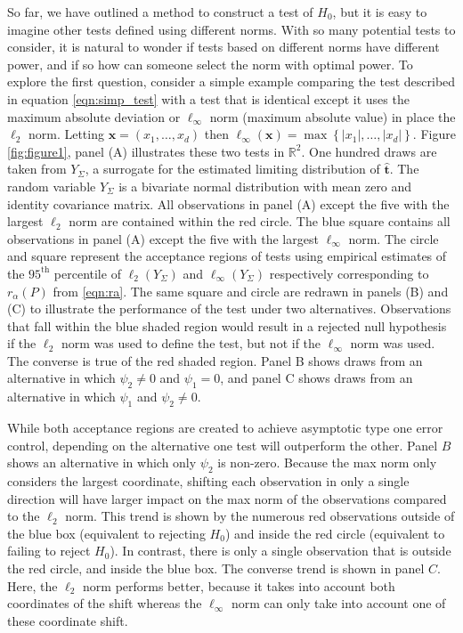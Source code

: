 \documentclass{article}
\newcommand{\tst}{\hat{\boldsymbol{t}}}
\newcommand{\nrvs}{Y_\Sigma}
\begin{document}
So far, we have outlined a method to construct a test of $H_0$, but it is easy to imagine other tests defined using different norms. With so many potential tests to consider, it is natural to wonder if tests based on different norms have different power, and if so how can someone select the norm with optimal power. To explore the first question, consider a simple example comparing the test described in equation \eqref{eqn:simp_test} with a test that is identical except it uses the maximum absolute deviation or $\ell_\infty$ norm (maximum absolute value) in place the $\ell_2$ norm.  Letting $\boldsymbol{x} = (x_1, \dots, x_d)$ then $\ell_\infty(\boldsymbol{x}) = \max\left\{|x_1|, \dots, |x_d|\right\}$.  Figure \ref{fig:figure1}, panel (A) illustrates these two tests in $\mathbb{R}^2$. One hundred draws are taken from $\nrvs$, a surrogate for the estimated limiting distribution of $\tst$. The random variable $\nrvs$ is a bivariate normal distribution with mean zero and identity covariance matrix. All observations in panel (A) except the five with the largest $\ell_2$ norm are contained within the red circle. The blue square contains all observations in panel (A) except the five with the largest $\ell_\infty$ norm.  The circle and square represent the acceptance regions of tests using empirical estimates of the $95^{\text{th}}$ percentile of $\ell_2(\nrvs)$ and $\ell_\infty(\nrvs)$ respectively corresponding to $r_\alpha(P)$ from \eqref{eqn:ra}.  The same square and circle are redrawn in panels (B) and (C) to illustrate the performance of the test under two alternatives. Observations that fall within the blue shaded region would result in a rejected null hypothesis if the $\ell_2$ norm was used to define the test, but not if the $\ell_\infty$ norm was used. The converse is true of the red shaded region. Panel B shows draws from an alternative in which $\psi_2 \ne 0$ and $\psi_1 = 0$, and panel C shows draws from an alternative in which $\psi_1$ and $\psi_2 \neq 0$. 

While both acceptance regions are created to achieve asymptotic type one error control, depending on the alternative one test will outperform the other. Panel $B$ shows an alternative in which only $\psi_2$ is non-zero.  Because the max norm only considers the largest coordinate, shifting each observation in only a single direction will have larger impact on the max norm of the observations compared to the $\ell_2$ norm.  This trend is shown by the numerous red observations outside of the blue box (equivalent to rejecting $H_0$) and inside the red circle (equivalent to failing to reject $H_0$). In contrast, there is only a single observation that is outside the red circle, and inside the blue box. The converse trend is shown in panel $C$. Here, the $\ell_2$ norm performs better, because it takes into account both coordinates of the shift whereas the $\ell_\infty$ norm can only take into account one of these coordinate shift. 
\end{document}
